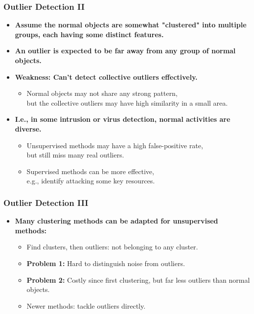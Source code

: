 \begin{frame}
  \frametitle{Outlier Detection II}
  \begin{itemize}
  \item \textbf{Assume the {\color{airforceblue}normal objects are somewhat "clustered"} into multiple groups, each having some distinct features.}
  \item\textbf{An outlier is expected to be {\color{airforceblue}far away from any group} of normal objects.}
  \item \textbf{Weakness: Can't detect collective outliers effectively.}
    \begin{itemize}
    \item Normal objects may not share any strong pattern, \\
      but the collective outliers may have high similarity in a small area.
    \end{itemize}
  \item \textbf{I.e., in some intrusion or virus detection, normal activities are diverse.}
    \begin{itemize}
    \item Unsupervised methods may have a high false-positive rate, \\
      but still miss many real outliers.
    \item Supervised methods can be more effective, \\
      e.g., identify attacking some key resources.
    \end{itemize}
  \end{itemize}
\end{frame}


\begin{frame}
  \frametitle{Outlier Detection III}
  \begin{itemize}
  \item \textbf{Many clustering methods can be adapted for unsupervised methods:}
    \begin{itemize}
    \item Find clusters, then outliers: not belonging to any cluster.
    \item \textbf{Problem 1:} Hard to distinguish noise from outliers.
    \item \textbf{Problem 2:} Costly since first clustering, but far less outliers than normal objects.
    \item Newer methods: tackle outliers directly.
    \end{itemize}
  \end{itemize}
\end{frame}



